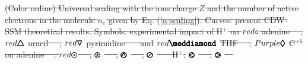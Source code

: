 \documentclass[10pt,showpacs,showkeys,twocolumn]{revtex4-1} %
\providecommand{\DIFdel}[1]{{\protect\color{red}\sout{#1}}}                      %
\providecommand{\DIFdelbegin}{} %
\providecommand{\DIFdelFL}[1]{\DIFdel{#1}} %
\newcommand{\DIFscaledelfig}{0.5}
\newlength{\DIFdelgraphicswidth} %
\newlength{\DIFdelgraphicsheight} %
\newcommand{\DIFdelincludegraphics}[2][]{%
\sbox{\DIFdelgraphicsbox}{\DIFOincludegraphics[#1]{#2}}%
\settoboxwidth{\DIFdelgraphicswidth}{\DIFdelgraphicsbox} %
\settoboxtotalheight{\DIFdelgraphicsheight}{\DIFdelgraphicsbox} %
\scalebox{\DIFscaledelfig}{%
\parbox[b]{\DIFdelgraphicswidth}{\usebox{\DIFdelgraphicsbox}\\[-\baselineskip] \rule{\DIFdelgraphicswidth}{0em}}\llap{\resizebox{\DIFdelgraphicswidth}{\DIFdelgraphicsheight}{%
\setlength{\unitlength}{\DIFdelgraphicswidth}%
\begin{picture}(1,1)%
\thicklines\linethickness{2pt} %
{\color[rgb]{1,0,0}\put(0,0){\framebox(1,1){}}}%
{\color[rgb]{1,0,0}\put(0,0){\line( 1,1){1}}}%
{\color[rgb]{1,0,0}\put(0,1){\line(1,-1){1}}}%
\end{picture}%
}\hspace*{3pt}}} %
} %
\DeclareRobustCommand{\DIFdelbegin}{\DIFOdelbegin \let\includegraphics\DIFdelincludegraphics} %
\begin{document}
\DIFdelbegin %
{%
\DIFdelFL{(Color online) Universal scaling with the ions charge $Z$ and 
the number of active electrons in the molecule $n_e$ given by 
Eq. (\ref{u-scaling}). Curves: present CDW-SSM theoretical results. 
Symbols: experimental impact of H$^+$ on 
\mbox{\LARGE$\color{red}\circ$} adenine~\mbox{%
\cite{iriki2011}}\hspace{0pt}%
, 
}%
\DIFdelFL{$\color{red}\pmb{\triangle}$}%
\DIFdelFL{uracil~\mbox{%
\cite{itoh2013}}\hspace{0pt}%
, 
}%
\DIFdelFL{$\color{red}\pmb{\triangledown}$}%
\DIFdelFL{pyrimidine~\mbox{%
\cite{wolff2014} }\hspace{0pt}%
and 
}%
\DIFdelFL{$\color{red}\pmb{\meddiamond}$}%
\DIFdelFL{THF~\mbox{%
\cite{wang2016}}\hspace{0pt}%
;
}%
\DIFdelFL{$\color{Purple}\pmb{\lozenge}$}%
\DIFdelFL{C$^{+6}$ on adenine \mbox{%
\cite{tribedi2019}}\hspace{0pt}%
;
\mbox{\fontsize{11}{20}$\color{red}\pmb{\odot}$}~\mbox{%
\cite{Luna2007}}\hspace{0pt}%
, 
}%
\DIFdelFL{$\pmb{\logof}$}%
\DIFdelFL{~\mbox{%
\cite{Rudd86}}\hspace{0pt}%
, 
}%
\DIFdelFL{$\pmb{\varowedge}$}%
\DIFdelFL{~\mbox{%
\cite{pRudd85}}\hspace{0pt}%
, 
}%
\DIFdelFL{$\pmb{\varoslash}$}%
\DIFdelFL{~\mbox{%
\cite{toburen80} }\hspace{0pt}%
H$^+$,
}%
\DIFdelFL{$\pmb{\varolessthan}$}%
\DIFdelFL{~\mbox{%
\cite{Ohsawa05}}\hspace{0pt}%
,
}%
\DIFdelFL{$\pmb{\varogreaterthan}$}%
\DIFdelFL{~\mbox{%
}}}
\end{document}
